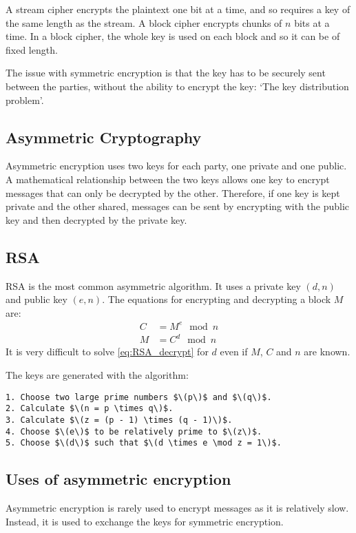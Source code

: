 A stream cipher encrypts the plaintext one bit at a time, and so requires a key of the same length as the stream. A block cipher encrypts chunks of \(n\) bits at a time. In a block cipher, the whole key is used on each block and so it can be of fixed length.

The issue with symmetric encryption is that the key has to be securely sent between the parties, without the ability to encrypt the key: `The key distribution problem'.

\subsection{Asymmetric Cryptography}
Asymmetric encryption uses two keys for each party, one private and one public. A mathematical relationship between the two keys allows one key to encrypt messages that can only be decrypted by the other. Therefore, if one key is kept private and the other shared, messages can be sent by encrypting with the public key and then decrypted by the private key.

\subsection{RSA}
RSA is the most common asymmetric algorithm. It uses a private key \((d, n)\) and public key \((e, n)\). The equations for encrypting and decrypting a block \(M\) are:
\begin{align}
    C & = M^e \mod n \label{eq:RSA_encrypt} \\
    M & = C^d \mod n \label{eq:RSA_decrypt}
\end{align}
It is very difficult to solve \cref{eq:RSA_decrypt} for \(d\) even if \(M\), \(C\) and \(n\) are known.

The keys are generated with the algorithm:
\begin{lstlisting}
1. Choose two large prime numbers $\(p\)$ and $\(q\)$.
2. Calculate $\(n = p \times q\)$.
3. Calculate $\(z = (p - 1) \times (q - 1)\)$.
4. Choose $\(e\)$ to be relatively prime to $\(z\)$.
5. Choose $\(d\)$ such that $\(d \times e \mod z = 1\)$.
\end{lstlisting}

\subsection{Uses of asymmetric encryption}
Asymmetric encryption is rarely used to encrypt messages as it is relatively slow. Instead, it is used to exchange the keys for symmetric encryption.

